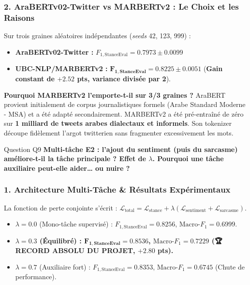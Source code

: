 \documentclass[11pt,a4paper]{article}
\begin{document}
\subsubsection*{2. AraBERTv02-Twitter vs MARBERTv2 : Le Choix et les Raisons}
Sur trois graines aléatoires indépendantes (\textit{seeds} 42, 123, 999) :
\begin{itemize}[noitemsep]
    \item \textbf{AraBERTv02-Twitter :} $F_{1,\text{StanceEval}} = 0.7973 \pm 0.0099$
    \item \textbf{UBC-NLP/MARBERTv2 :} $\mathbf{F_{1,\text{StanceEval}} = 0.8225 \pm 0.0051}$ (\textbf{Gain constant de $+2.52$ pts, variance divisée par 2}).
\end{itemize}
\textbf{Pourquoi MARBERTv2 l'emporte-t-il sur 3/3 graines ?}  
AraBERT provient initialement de corpus journalistiques formels (Arabe Standard Moderne - MSA) et a été adapté secondairement. MARBERTv2 a été pré-entraîné de zéro sur \textbf{1 milliard de tweets arabes dialectaux et informels}. Son tokenizer découpe fidèlement l'argot twitterien sans fragmenter excessivement les mots.

\vspace{0.3cm}

\begin{questionbox}{Question Q9}
\textbf{Multi-tâche E2 : l'ajout du sentiment (puis du sarcasme) améliore-t-il la tâche principale ? Effet de $\lambda$. Pourquoi une tâche auxiliaire peut-elle aider… ou nuire ?}
\end{questionbox}

\subsubsection*{1. Architecture Multi-Tâche \& Résultats Expérimentaux}
La fonction de perte conjointe s'écrit : $\mathcal{L}_{\text{total}} = \mathcal{L}_{\text{stance}} + \lambda \left(\mathcal{L}_{\text{sentiment}} + \mathcal{L}_{\text{sarcasme}}\right)$.
\begin{itemize}[noitemsep]
    \item $\lambda = 0.0$ (Mono-tâche supervisé) : $F_{1,\text{StanceEval}} = 0.8256$, \quad $\text{Macro-}F_1 = 0.6999$.
    \item \textbf{$\lambda = 0.3$ (Équilibré) : $\mathbf{F_{1,\text{StanceEval}} = 0.8536}$, \quad $\text{Macro-}F_1 = \mathbf{0.7229}$ (🏆 RECORD ABSOLU DU PROJET, $+2.80$ pts).}
    \item $\lambda = 0.7$ (Auxiliaire fort) : $F_{1,\text{StanceEval}} = 0.8353$, \quad $\text{Macro-}F_1 = 0.6745$ (Chute de performance).
\end{itemize}
\end{document}
